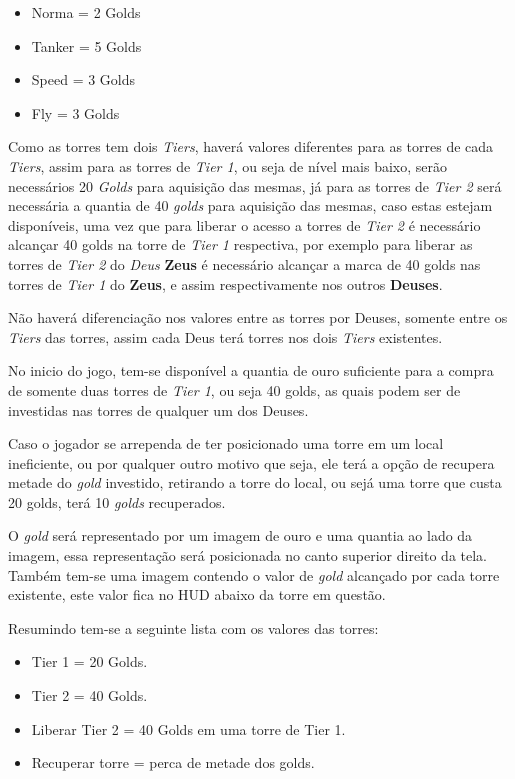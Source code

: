 \documentclass[11pt]{article} %
\begin{document}
\begin{itemize}
 \item Norma = 2 Golds
 \item Tanker = 5 Golds
 \item Speed = 3 Golds
 \item Fly = 3 Golds
 \end{itemize} 
 
Como as torres tem dois \textit{Tiers}, haverá valores diferentes para as torres de cada \textit{Tiers}, assim para as torres de \textit{Tier 1}, ou seja de nível mais baixo, serão necessários 20 \textit{Golds} para aquisição das mesmas, já para as torres de \textit{Tier 2} será necessária a quantia de 40 \textit{golds} para aquisição das mesmas, caso estas estejam disponíveis, uma vez que para liberar o acesso a torres de \textit{Tier 2} é necessário alcançar 40 golds na torre de \textit{Tier 1} respectiva, por exemplo para liberar as torres de \textit{Tier 2} do \textit{Deus} \textbf{Zeus} é necessário alcançar a marca de 40 golds nas torres de \textit{Tier 1} do \textbf{Zeus}, e assim respectivamente nos outros \textbf{Deuses}.

Não haverá diferenciação nos valores entre as torres por Deuses, somente entre os \textit{Tiers} das torres, assim cada Deus terá torres nos dois \textit{Tiers} existentes.
 
No inicio do jogo, tem-se disponível a quantia de ouro suficiente para a compra de somente duas torres de \textit{Tier 1}, ou seja 40 golds, as quais podem ser de investidas nas torres de qualquer um dos Deuses.  

Caso o jogador se arrependa de ter posicionado uma torre em um local ineficiente, ou por qualquer outro motivo que seja, ele terá a opção de recupera metade do \textit{gold} investido, retirando a torre do local, ou sejá uma torre que custa 20 golds, terá 10 \textit{golds} recuperados.
 
 
O \textit{gold} será representado por um imagem de ouro e uma quantia ao lado da imagem, essa representação será posicionada no canto superior direito da tela. Também tem-se uma imagem contendo o valor de \textit{gold} alcançado por cada torre existente, este valor fica no HUD abaixo da torre em questão.

Resumindo tem-se a seguinte lista com os valores das torres:
\begin{itemize}
 \item Tier 1 = 20 Golds.
 \item Tier 2 = 40 Golds.
 \item Liberar Tier 2 = 40 Golds em uma torre de Tier 1.
 \item Recuperar torre = perca de metade dos golds.
\end{itemize} 
\end{document}
